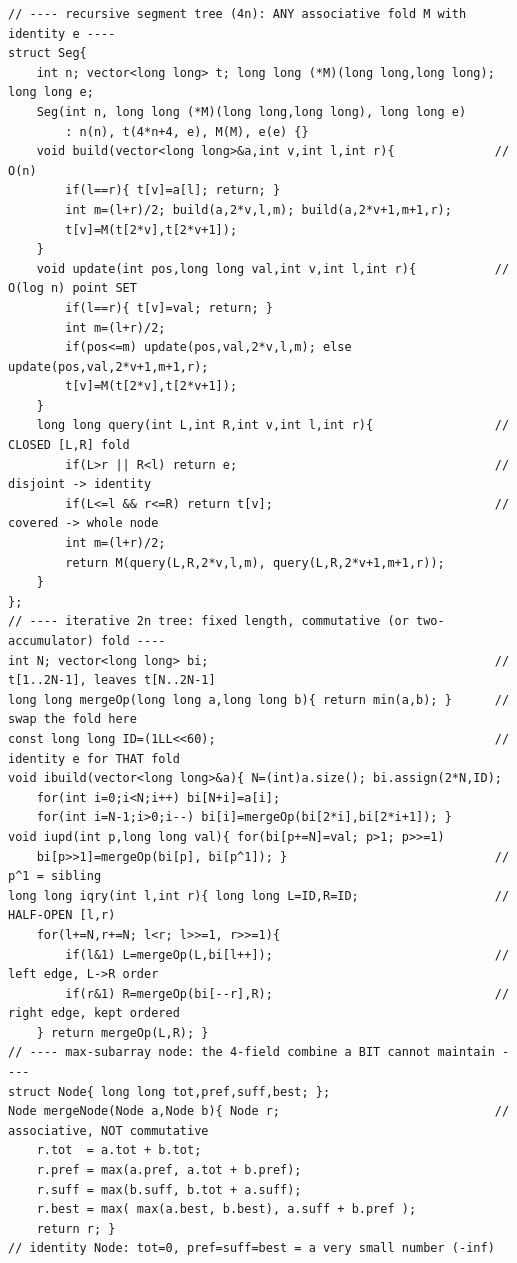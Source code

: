 \begin{lstlisting}[caption={Chapter 19 kit: the recursive tree, the iterative 2n form, and the max-subarray combine, complete and production-shaped}, label={lst:c13-kit}]
// ---- recursive segment tree (4n): ANY associative fold M with identity e ----
struct Seg{
    int n; vector<long long> t; long long (*M)(long long,long long); long long e;
    Seg(int n, long long (*M)(long long,long long), long long e)
        : n(n), t(4*n+4, e), M(M), e(e) {}
    void build(vector<long long>&a,int v,int l,int r){              // O(n)
        if(l==r){ t[v]=a[l]; return; }
        int m=(l+r)/2; build(a,2*v,l,m); build(a,2*v+1,m+1,r);
        t[v]=M(t[2*v],t[2*v+1]);
    }
    void update(int pos,long long val,int v,int l,int r){           // O(log n) point SET
        if(l==r){ t[v]=val; return; }
        int m=(l+r)/2;
        if(pos<=m) update(pos,val,2*v,l,m); else update(pos,val,2*v+1,m+1,r);
        t[v]=M(t[2*v],t[2*v+1]);
    }
    long long query(int L,int R,int v,int l,int r){                 // CLOSED [L,R] fold
        if(L>r || R<l) return e;                                    // disjoint -> identity
        if(L<=l && r<=R) return t[v];                               // covered -> whole node
        int m=(l+r)/2;
        return M(query(L,R,2*v,l,m), query(L,R,2*v+1,m+1,r));
    }
};
// ---- iterative 2n tree: fixed length, commutative (or two-accumulator) fold ----
int N; vector<long long> bi;                                        // t[1..2N-1], leaves t[N..2N-1]
long long mergeOp(long long a,long long b){ return min(a,b); }      // swap the fold here
const long long ID=(1LL<<60);                                       // identity e for THAT fold
void ibuild(vector<long long>&a){ N=(int)a.size(); bi.assign(2*N,ID);
    for(int i=0;i<N;i++) bi[N+i]=a[i];
    for(int i=N-1;i>0;i--) bi[i]=mergeOp(bi[2*i],bi[2*i+1]); }
void iupd(int p,long long val){ for(bi[p+=N]=val; p>1; p>>=1)
    bi[p>>1]=mergeOp(bi[p], bi[p^1]); }                             // p^1 = sibling
long long iqry(int l,int r){ long long L=ID,R=ID;                   // HALF-OPEN [l,r)
    for(l+=N,r+=N; l<r; l>>=1, r>>=1){
        if(l&1) L=mergeOp(L,bi[l++]);                               // left edge, L->R order
        if(r&1) R=mergeOp(bi[--r],R);                               // right edge, kept ordered
    } return mergeOp(L,R); }
// ---- max-subarray node: the 4-field combine a BIT cannot maintain ----
struct Node{ long long tot,pref,suff,best; };
Node mergeNode(Node a,Node b){ Node r;                              // associative, NOT commutative
    r.tot  = a.tot + b.tot;
    r.pref = max(a.pref, a.tot + b.pref);
    r.suff = max(b.suff, b.tot + a.suff);
    r.best = max( max(a.best, b.best), a.suff + b.pref );
    return r; }
// identity Node: tot=0, pref=suff=best = a very small number (-inf)
\end{lstlisting}


